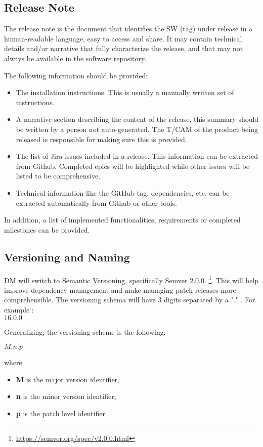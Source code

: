 \subsection{Release Note} \label{sec:relnote}

The release note is the document that identifies the SW (tag) under release in a human-readable language, easy to access and share. 
It may contain technical details and/or narrative that fully characterize the release, and that may not always be available in the software repository.

The following information should be provided:
\begin{itemize}
\item The installation instructions. This is usually a manually written set of instructions. 
\item A narrative section describing the content of the release, this summary should be written by a person not auto-generated.
The T/CAM of the product being released is responsible for making sure this is provided.
\item The list of Jira issues included in a release. This information can be extracted from Github. 
Completed epics will be highlighted while other issues will be listed to be comprehensive.
\item Technical information like the GitHub tag, dependencies, etc. can be extracted automatically from Github or other tools.
\end{itemize}

In addition, a list of implemented functionalities, requirements or completed milestones can be provided.

\subsection{Versioning and Naming} \label{sec:versioning}

DM will  switch to Semantic Versioning, specifically Semver 2.0.0. \footnote{\url{https://semver.org/spec/v2.0.0.html}}.
This will help improve dependency management and make managing patch releases more comprehensible.
The versioning schema will have 3 digits separated by a "." . For example :
\\
$16.0.0$

Generalizing, the versioning scheme is the following:

$M.n.p$

where

\begin{itemize}
\item \textbf{M} is the major version identifier,
\item \textbf{n} is the minor version identifier,
\item \textbf{p} is the patch level identifier
\end{itemize}

